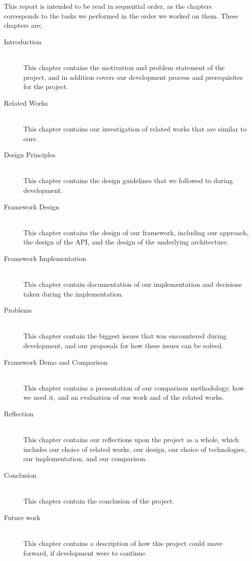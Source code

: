 This report is intended to be read in sequential order, as the chapters corresponds to the tasks we performed in the order we worked on them. These chapters are;
\begin{description}
    \item[Introduction]\hfill\\
    This chapter contains the motivation and problem statement of the project, and in addition covers our development process and prerequisites for the project.
    \item[Related Works]\hfill\\
    This chapter contains our investigation of related works that are similar to ours.
    \item[Design Principles]\hfill\\
    This chapter contains the design guidelines that we followed to during development.
    \item[Framework Design]\hfill\\
    This chapter contains the design of our framework, including our approach, the design of the API, and the design of the underlying architecture.
    \item[Framework Implementation]\hfill\\
    This chapter contain documentation of our implementation and decisions taken during the implementation.
    \item[Problems] \hfill\\
    This chapter contain the biggest issues that was encountered during development, and our proposals for how these issues can be solved.
    \item[Framework Demo and Comparison]\hfill\\
    This chapter contains a presentation of our comparison methodology, how we used it, and an evaluation of our work and of the related works.
    \item[Reflection]\hfill\\
    This chapter contains our reflections upon the project as a whole, which includes our choice of related works, our design, our choice of technologies, our implementation, and our comparison.
    \item[Conclusion]\hfill\\
    This chapter contain the conclusion of the project.
    \item[Future work]\hfill\\
    This chapter contains a description of how this project could move forward, if development were to continue.
\end{description}